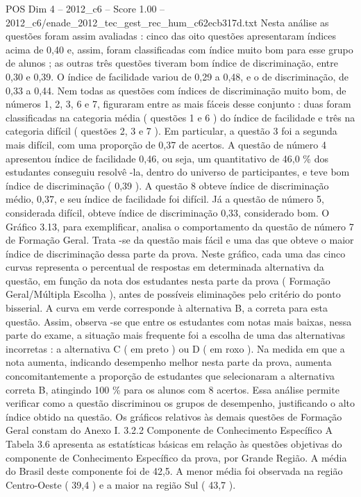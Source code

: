 \begin{textsample}{POS Dim 4 – 2012\_c6 – Score 1.00 – 2012\_c6/enade\_2012\_tec\_gest\_rec\_hum\_c62ecb317d.txt}
Nesta análise as questões foram assim avaliadas : cinco das oito questões apresentaram índices acima de 0,40 e, assim, foram classificadas com índice muito bom para esse grupo de alunos ; as outras três questões tiveram bom índice de discriminação, entre 0,30 e 0,39.
O índice de facilidade variou de 0,29 a 0,48, e o de discriminação, de 0,33 a 0,44.
Nem todas as questões com índices de discriminação muito bom, de números 1, 2, 3, 6 e 7, figuraram entre as mais fáceis desse conjunto : duas foram classificadas na categoria média ( questões 1 e 6 ) do índice de facilidade e três na categoria difícil ( questões 2, 3 e 7 ).
Em particular, a questão 3 foi a segunda mais difícil, com uma proporção de 0,37 de acertos.
A questão de número 4 apresentou índice de facilidade 0,46, ou seja, um quantitativo de 46,0 \% dos estudantes conseguiu resolvê -la, dentro do universo de participantes, e teve bom índice de discriminação ( 0,39 ).
A questão 8 obteve índice de discriminação médio, 0,37, e seu índice de facilidade foi difícil.
Já a questão de número 5, considerada difícil, obteve índice de discriminação 0,33, considerado bom.
O Gráfico 3.13, para exemplificar, analisa o comportamento da questão de número 7 de Formação Geral.
Trata -se da questão mais fácil e uma das que obteve o maior índice de discriminação dessa parte da prova.
Neste gráfico, cada uma das cinco curvas representa o percentual de respostas em determinada alternativa da questão, em função da nota dos estudantes nesta parte da prova ( Formação Geral/Múltipla Escolha ), antes de possíveis eliminações pelo critério do ponto bisserial.
A curva em verde corresponde à alternativa B, a correta para esta questão.
Assim, observa -se que entre os estudantes com notas mais baixas, nessa parte do exame, a situação mais frequente foi a escolha de uma das alternativas incorretas : a alternativa C ( em preto ) ou D ( em roxo ).
Na medida em que a nota aumenta, indicando desempenho melhor nesta parte da prova, aumenta concomitantemente a proporção de estudantes que selecionaram a alternativa correta B, atingindo 100 \% para os alunos com 8 acertos.
Essa análise permite verificar como a questão discriminou os grupos de desempenho, justificando o alto índice obtido na questão.
Os gráficos relativos às demais questões de Formação Geral constam do Anexo I. 3.2.2 Componente de Conhecimento Específico A Tabela 3.6 apresenta as estatísticas básicas em relação às questões objetivas do componente de Conhecimento Específico da prova, por Grande Região.
A média do Brasil deste componente foi de 42,5.
A menor média foi observada na região Centro-Oeste ( 39,4 ) e a maior na região Sul ( 43,7 ).

\end{textsample}

